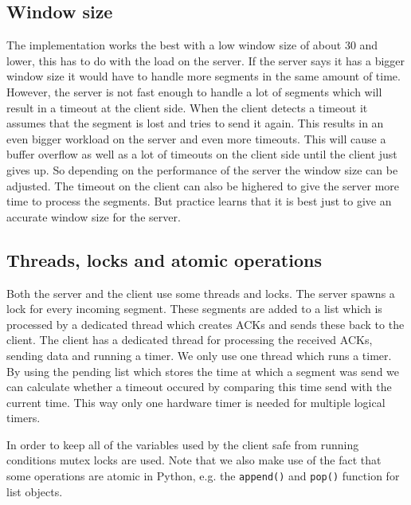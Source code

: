 \documentclass[a4paper]{article}
\begin{document}
	\subsection{Window size}\label{sec: window size}
	The implementation works the best with a low window size of about 30 and lower, this has to do with the load on the server. If the server says it has a bigger window size it would have to handle more segments in the same amount of time. However, the server is not fast enough to handle a lot of segments which will result in a timeout at the client side. When the client detects a timeout it assumes that the segment is lost and tries to send it again. This results in an even bigger workload on the server and even more timeouts. This will cause a buffer overflow as well as a lot of timeouts on the client side until the client just gives up. So depending on the performance of the server the window size can be adjusted. The timeout on the client can also be highered to give the server more time to process the segments. But practice learns that it is best just to give an accurate window size for the server.

	\subsection{Threads, locks and atomic operations}
	Both the server and the client use some threads and locks. The server spawns a lock for every incoming segment. These segments are added to a list which is processed by a dedicated thread which creates ACKs and sends these back to the client. The client has a dedicated thread for processing the received ACKs, sending data and running a timer. We only use one thread which runs a timer. By using the pending list which stores the time at which a segment was send we can calculate whether a timeout occured by comparing this time send with the current time. This way only one hardware timer is needed for multiple logical timers.

	In order to keep all of the variables used by the client safe from running conditions mutex locks are used. Note that we also make use of the fact that some operations are atomic in Python, e.g. the \texttt{append()} and \texttt{pop()} function for list objects.
\end{document}
